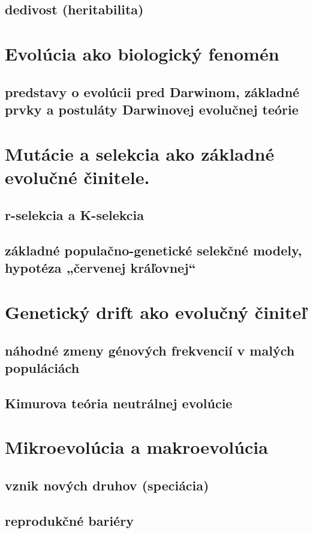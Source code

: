 \subsection{dedivost (heritabilita)}

\section{Evolúcia ako biologický fenomén}
\subsection{predstavy o evolúcii pred Darwinom, základné prvky a postuláty Darwinovej evolučnej teórie}

\section{Mutácie a selekcia ako základné evolučné činitele.}
\subsection{r-selekcia a K-selekcia}
\subsection{základné populačno-genetické selekčné modely, hypotéza „červenej kráľovnej“}

\section{Genetický drift ako evolučný činiteľ}
\subsection{náhodné zmeny génových frekvencií v malých populáciách}
\subsection{Kimurova teória neutrálnej evolúcie}

\section{Mikroevolúcia a makroevolúcia}
\subsection{vznik nových druhov (speciácia)}
\subsection{reprodukčné bariéry}
